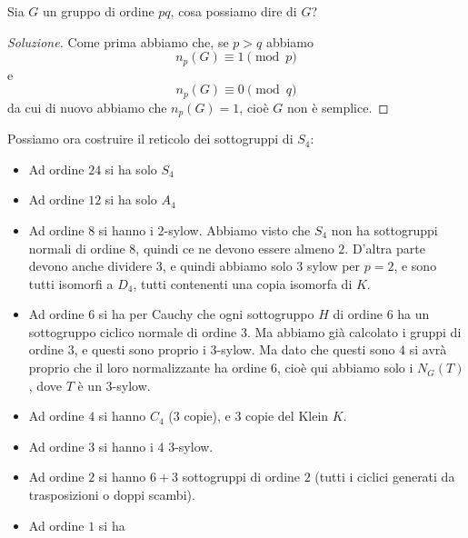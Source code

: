 \documentclass[11pt]{scrartcl}
\begin{document}
	 \begin{exercise}
	 	Sia $G$ un gruppo di ordine $pq$, cosa possiamo dire di $G$?
	 \end{exercise}
	 \begin{proof}[Soluzione]
	 	Come prima abbiamo che, se $p>q$ abbiamo
	 	$$n_p(G)\equiv 1 \pmod{p}$$
	 	e
	 	$$n_p(G)\equiv 0 \pmod{q}$$
	 	da cui di nuovo abbiamo che $n_p(G)=1$, cioè $G$ non è semplice.
	 \end{proof}
	 Possiamo ora costruire il reticolo dei sottogruppi di $S_4$:
	 \begin{center}
	 \end{center}
	 \begin{itemize}
	 	\item Ad ordine $24$ si ha solo $S_4$
	 	\item Ad ordine $12$ si ha solo $A_4$
	 	\item Ad ordine $8$ si hanno i $2$-sylow. Abbiamo visto che $S_4$ non ha sottogruppi normali di ordine $8$, quindi ce ne devono essere almeno $2$. D'altra parte devono anche dividere $3$, e quindi abbiamo solo $3$ sylow per $p=2$, e sono tutti isomorfi a $D_4$, tutti contenenti una copia isomorfa di $K$.
	 	\item Ad ordine $6$ si ha per Cauchy che ogni sottogruppo $H$ di ordine $6$ ha un sottogruppo ciclico normale di ordine $3$. Ma abbiamo già calcolato i gruppi di ordine $3$, e questi sono proprio i $3$-sylow. Ma dato che questi sono $4$ si avrà proprio che il loro normalizzante ha ordine $6$, cioè qui abbiamo solo i $N_G(T)$, dove $T$ è un $3$-sylow.
	 	\item Ad ordine $4$ si hanno $C_4$ (3 copie), e $3$ copie del Klein $K$. 
	 	\item Ad ordine $3$ si hanno i $4$ $3$-sylow.
	 	\item Ad ordine $2$ si hanno $6+3$ sottogruppi di ordine $2$ (tutti i ciclici generati da trasposizioni o doppi scambi).
	 	\item Ad ordine $1$ si ha
	 \end{itemize}
	 
\end{document}

